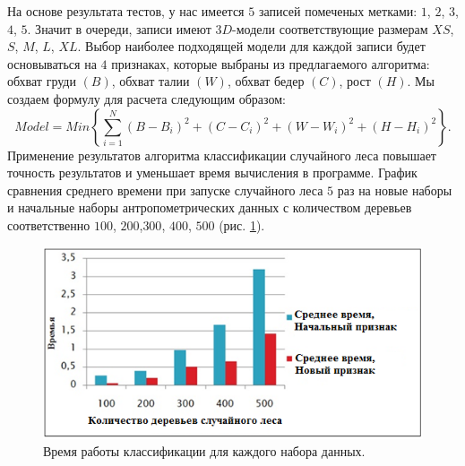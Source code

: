 На основе результата тестов, у нас имеется $5$ записей помеченых метками: $1$, $2$, $3$, $4$, $5$. Значит в очереди, записи имеют $3D$-модели соответствующие размерам $XS$, $S$, $M$, $L$, $XL$. Выбор наиболее подходящей модели для каждой записи будет основываться на $4$ признаках, которые выбраны из предлагаемого алгоритма: обхват груди $\left(B\right)$, обхват талии $\left(W\right)$, обхват бедер $\left(C\right)$, рост $\left(H\right)$. Мы создаем формулу для расчета следующим образом:
\begin{equation}\label{eq26}
Model = Min\left\{\sum^N_{i=1}\left(B-B_i\right)^2+\left(C-C_i\right)^2+\left(W-W_i\right)^2+\left(H-H_i\right)^2\right\}.
\end{equation}
Применение результатов алгоритма классификации случайного леса повышает точность результатов и уменьшает время вычисления в программе. График сравнения среднего времени при запуске случайного леса $5$ раз на новые наборы и начальные наборы антропометрических данных с количеством деревьев соответственно $100$, $200$,$300$, $400$, $500$ (рис. \ref{img20}).
\begin{figure}[ht!]
\centering
\includegraphics [scale=1] {images/h20.png}
\begin{center}
\caption{Время работы классификации для каждого набора данных.} \label{img20}
\end{center}
\end{figure}